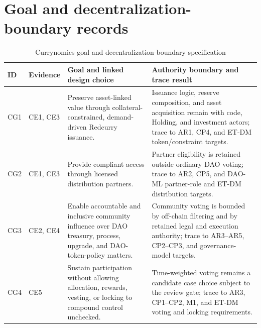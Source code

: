 \documentclass[10pt]{article}
\begin{document}
\section*{Goal and decentralization-boundary records}
\begin{table}[h]
\caption{Currynomics goal and decentralization-boundary specification}
\centering
\small
\begin{tabularx}{\linewidth}{@{}p{.07\linewidth}p{.13\linewidth}YY@{}}
\toprule
ID & Evidence & Goal and linked design choice & Authority boundary and trace result \\
\midrule
CG1 & CE1, CE3 & Preserve asset-linked value through collateral-constrained,
demand-driven Redcurry issuance. & Issuance logic, reserve composition, and
asset acquisition remain with code, Holding, and investment actors; trace to
AR1, CP4, and ET-DM token/constraint targets. \\
CG2 & CE1, CE3 & Provide compliant access through licensed distribution
partners. & Partner eligibility is retained outside ordinary DAO voting; trace
to AR2, CP5, and DAO-ML partner-role and ET-DM distribution targets. \\
CG3 & CE2, CE4 & Enable accountable and inclusive community influence over DAO
treasury, process, upgrade, and DAO-token-policy matters. & Community voting is
bounded by off-chain filtering and by retained legal and execution authority;
trace to AR3--AR5, CP2--CP3, and governance-model targets. \\
CG4 & CE5 & Sustain participation without allowing allocation, rewards,
vesting, or locking to compound control unchecked. & Time-weighted voting
remains a candidate case choice subject to the review gate; trace to AR3,
CP1--CP2, M1, and ET-DM voting and locking requirements. \\
\bottomrule
\end{tabularx}
\end{table}
\end{document}
